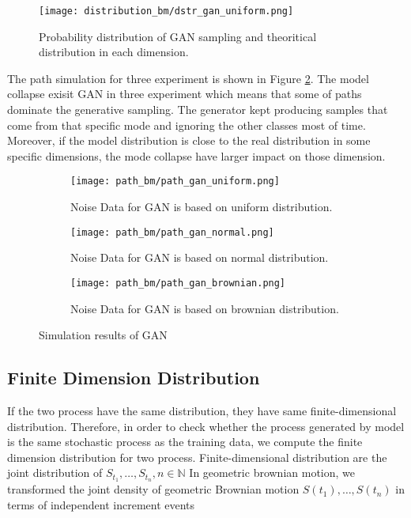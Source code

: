 \documentclass{article}
\begin{document}
	
	\begin{figure}[h]
		\centering
		\texttt{[image: distribution\_bm/dstr\_gan\_uniform.png]}
		\caption{Probability distribution of GAN sampling and theoritical distribution in each dimension.}
		\label{fig:dstr_gan_uniform}
	\end{figure}
	
		
	The path simulation for three experiment is shown in Figure \ref{fig:path_gan}. 
	The model collapse exisit GAN in three experiment which means that some of paths dominate the generative sampling.
	The generator kept producing samples that come from that specific mode and  ignoring the other classes most of time. 
	Moreover, if the model distribution is close to the real distribution in some specific dimensions, the mode collapse have larger impact on those dimension.
	
	\begin{figure}[h]
		\centering
		\begin{subfigure}[b]{0.6\textwidth}
			\texttt{[image: path\_bm/path\_gan\_uniform.png]}
			\caption{Noise Data for GAN is based on uniform distribution.}
		\end{subfigure}
		
			\begin{subfigure}[b]{0.6\textwidth}
			\texttt{[image: path\_bm/path\_gan\_normal.png]}
			\caption{Noise Data for GAN is based on normal distribution.}
		\end{subfigure}

		\begin{subfigure}[b]{0.6\textwidth}
			\texttt{[image: path\_bm/path\_gan\_brownian.png]}
			\caption{Noise Data for GAN is based on brownian distribution.}
		\end{subfigure}
	
	
		\caption{Simulation results of GAN}
		\label{fig:path_gan}
	\end{figure}

	\subsection{Finite Dimension Distribution}
	
	If the two process have the same distribution, they have same finite-dimensional distribution.
	Therefore, in order to check whether the process generated by model is the same stochastic process as the training data, we compute the finite dimension distribution for two process.
	Finite-dimensional distribution are the joint distribution of $S_{t_{1}}, \dots, S_{t_{n}}, n \in \mathbb{N}$
	In geometric brownian motion, we transformed the joint density of geometric Brownian motion $S(t_{1}), \dots, S(t_{n})$ in terms of independent increment events
	
\end{document}
